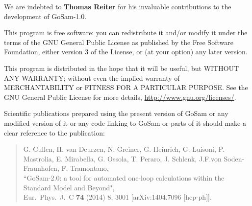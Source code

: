 \documentclass[11pt,a4paper]{refrep}
\begin{document}
    We are indebted to {\bf Thomas Reiter} for his invaluable contributions 
    to the development of GoSam-1.0.

    This program is free software: you can redistribute it and/or modify
    it under the terms of the GNU General Public License as published by
    the Free Software Foundation, either version 3 of the License, or
    (at your option) any later version.

    This program is distributed in the hope that it will be useful,
    but WITHOUT ANY WARRANTY; without even the implied warranty of
    MERCHANTABILITY or FITNESS FOR A PARTICULAR PURPOSE.  See the
    GNU General Public License for more details, 
    \url{http://www.gnu.org/licenses/}.

   
    Scientific publications prepared using the present version of
    GoSam or any modified version of it or any code linking to
    GoSam or parts of it should make a clear reference to the publication:

    \begin{quote}
        G. Cullen,  H. van Deurzen, N. Greiner, G. Heinrich, G. Luisoni, 
              P. Mastrolia, E. Mirabella, G. Ossola, T. Peraro, J. Schlenk, 
	      J.F.von Soden-Fraunhofen, F. Tramontano, \\
	``GoSam-2.0: a tool for automated one-loop calculations within the Standard Model and Beyond",\\
	Eur.\ Phys.\ J.\ C {\bf 74} (2014) 8,  3001 [arXiv:1404.7096 [hep-ph]].
    \end{quote}





\begin{fullpage}

\end{fullpage}

\clearpage
\remarks
\end{document}
